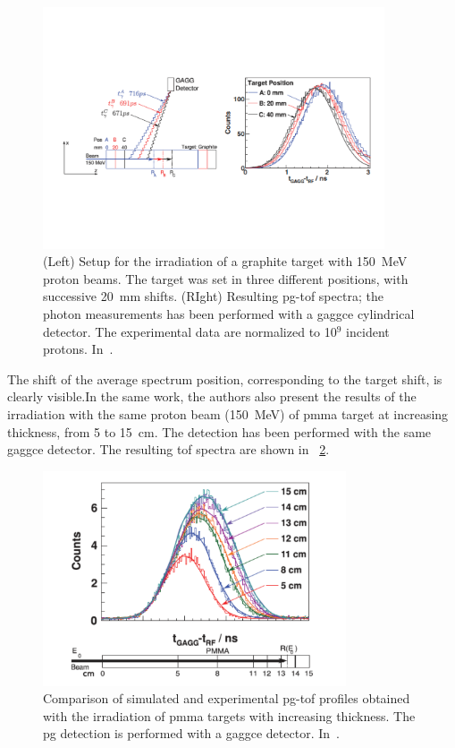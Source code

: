 \begin{figure}[!htbp]
\centering
\includegraphics[width=0.9\textwidth, trim = {1cm 5cm 1cm 5cm}, clip]{03_GraphicFiles/chapter2_GammaCameras/PGT_shifts.pdf}
\caption{(Left) Setup for the irradiation of a graphite target with 150~MeV proton beams. The target was set in three different positions, with successive 20~mm shifts. (RIght) Resulting \gls{pg}-\gls{tof} spectra; the photon measurements has been performed with a \gls{gaggce} cylindrical detector. The experimental data are normalized to 10$^9$ incident protons. In~\cite{Golnik2014}.}
\label{chap2::fig::PGT_shifts}
\end{figure}  

The shift of the average spectrum position, corresponding to the target shift, is clearly visible.In the same work, the authors also present the results of the irradiation with the same proton beam (150~MeV) of \gls{pmma} target at increasing thickness, from 5 to 15~cm. The detection has been performed with the same \gls{gaggce} detector. The resulting \gls{tof} spectra are shown in \figurename~\ref{chap2::fig::PGT_PMMA}.

\begin{figure}[!htbp]
\centering
\includegraphics[width=0.8\textwidth]{03_GraphicFiles/chapter2_GammaCameras/PGT_PMMA.pdf}
\caption{Comparison of simulated and experimental \gls{pg}-\gls{tof} profiles obtained with the irradiation of \gls{pmma} targets with increasing thickness. The \gls{pg} detection is performed with a \gls{gaggce} detector. In~\cite{Golnik2014}.}
\label{chap2::fig::PGT_PMMA}
\end{figure}  

